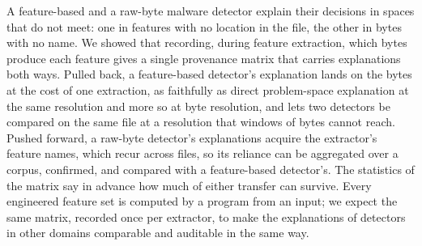 A feature-based and a raw-byte malware detector explain their decisions in spaces that do not meet: one in features
with no location in the file, the other in bytes with no name. We showed that recording, during feature extraction,
which bytes produce each feature gives a single provenance matrix that carries explanations both ways. Pulled back, a
feature-based detector's explanation lands on the bytes at the cost of one extraction, as faithfully as direct
problem-space explanation at the same resolution and more so at byte resolution, and lets two detectors be compared on
the same file at a resolution that windows of bytes cannot reach. Pushed forward, a raw-byte detector's explanations
acquire the extractor's feature names, which recur across files, so its reliance can be aggregated over a corpus,
confirmed, and compared with a feature-based detector's. The statistics of the matrix say in advance how much of
either transfer can survive. Every engineered feature set is computed by a program from an input; we expect the same
matrix, recorded once per extractor, to make the explanations of detectors in other domains comparable and auditable
in the same way.
